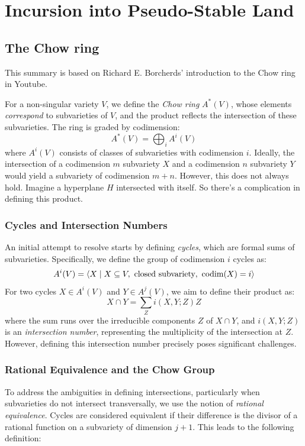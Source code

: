 \documentclass[12pt]{memoir}
\begin{document}
\chapter{Incursion into Pseudo-Stable Land}

\section{The Chow ring}

This summary is based on Richard E. Borcherds' introduction to the Chow ring in Youtube.

For a non-singular variety \( V \), we define the \emph{Chow ring} \( A^\ast(V) \), whose elements \emph{correspond} to subvarieties of \( V \), and the product reflects the intersection of these subvarieties. The ring is graded by codimension:
\[
A^\ast(V) = \bigoplus_i A^i(V)
\]
where \( A^i(V) \) consists of classes of subvarieties with codimension \( i \). Ideally, the intersection of a codimension \( m \) subvariety \( X \) and a codimension \( n \) subvariety \( Y \) would yield a subvariety of codimension \( m+n \). However, this does not always hold. Imagine a hyperplane $H$ intersected with itself. So there's a complication in defining this product.

\subsection{Cycles and Intersection Numbers}

An initial attempt to resolve starts by defining \emph{cycles}, which are formal sums of subvarieties. Specifically, we define the group of codimension \( i \) cycles as:
\[
A^i(V) = \left\langle X \mid X \subseteq V, \ \text{closed subvariety}, \ \codim(X) = i \right\rangle
\]
For two cycles \( X \in A^i(V) \) and \( Y \in A^j(V) \), we aim to define their product as:
\[
X \cap Y = \sum_{Z} i(X, Y; Z) Z
\]
where the sum runs over the irreducible components \( Z\) of \( X \cap Y \), and \( i(X, Y; Z) \) is an \emph{intersection number}, representing the multiplicity of the intersection at \( Z \). However, defining this intersection number precisely poses significant challenges.

\subsection{Rational Equivalence and the Chow Group}

To address the ambiguities in defining intersections, particularly when subvarieties do not intersect transversally, we use the notion of \emph{rational equivalence}. Cycles are considered equivalent if their difference is the divisor of a rational function on a subvariety of dimension \( j+1 \). This leads to the following definition:
\end{document}
